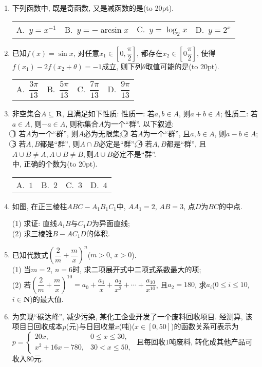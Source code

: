 \documentclass[10pt,a4paper]{article}
\newcommand{\bracket}[1]{(\hbox to #1pt{})}
\newcommand{\fourch}[4]{\par\begin{tabular}{p{.23\textwidth}p{.23\textwidth}p{.23\textwidth}p{.23\textwidth}}
A.~#1 &B.~#2& C.~#3& D.~#4
\end{tabular}}
\begin{document}
\begin{enumerate}[1.]
\item 下列函数中, 既是奇函数, 又是减函数的是\bracket{20}.
\fourch{$y=x^{-1}$}{$y=-\arcsin x$}{$y=\log_2x$}{$y=2^x$}
\item 已知$f(x)=\sin x$, 对任意$x_1 \in[0,\dfrac{\pi}2]$, 都存在$x_2\in [ 0\dfrac{\pi}2]$, 使得$f(x_1)-2f(x_2+\theta)=-1$成立, 则下列$\theta$取值可能的是\bracket{20}.
\fourch{$\dfrac{3\pi}{13}$}{$\dfrac{5\pi}{13}$}{$\dfrac{7\pi}{13}$}{$\dfrac{9\pi}{13}$}
\item 非空集合$A\subseteq \mathbf{R}$, 且满足如下性质:
性质一: 若$a,b\in A$, 则$a+b\in A$;
性质二: 若$a\in A$, 则$-a\in A$, 则称集合$A$为一个``群''. 以下叙述:\\
\textcircled{1} 若$A$为一个``群'', 则$A$必为无限集;
\textcircled{2} 若$A$为一个``群'', 且$a,b\in A$, 则$a-b\in A$;
\textcircled{3} 若$A,B$都是``群'', 则$A\cap B$必定是``群'';
\textcircled{4} 若$A,B$都是``群'', 且$A\cup B\ne A,A\cup B\ne B,$则$A\cup B$必定不是``群''.\\
中, 正确的个数为\bracket{20}.
\fourch{$1$}{$2$}{$3$}{$4$}
\item 如图, 在正三棱柱$ABC-A_1B_1C_1$中, $AA_1=2$, $AB=3$, 点$D$为$BC$的中点.
\begin{center}
\end{center}
(1) 求证: 直线$A_1B$与$C_1D$为异面直线;\\
(2) 求三棱锥$B-AC_1D$的体积.
\item 已知代数式$(\dfrac 2m+\dfrac mx)^n$($m>0$, $x>0$).\\
(1) 当$m=2$, $n=6$时, 求二项展开式中二项式系数最大的项;\\
(2) 若$(\dfrac 2m+\dfrac mx)^{10}=a_0+\dfrac{a_1}x+\dfrac{a_2}{x^2}+\cdots +\dfrac{a_{10}}{x^{10}}$, 且$a_2=180$, 求$a_i$($0\le i \le 10$, $i\in \mathbf{N}$)的最大值.
\item 为实现``碳达峰'', 减少污染, 某化工企业开发了一个废料回收项目. 经测算, 该项目日回收成本$p$(元)与日回收量$x$(吨)($x\in [0,50]$)的函数关系可表示为$p=\begin{cases}20x, & 0\le x\le 30,  \\ x^2+16x-780, & 30<x \le 50,  \end{cases}$ 且每回收$1$吨废料, 转化成其他产品可收入$80$元.\\

\end{enumerate}
\end{document}
